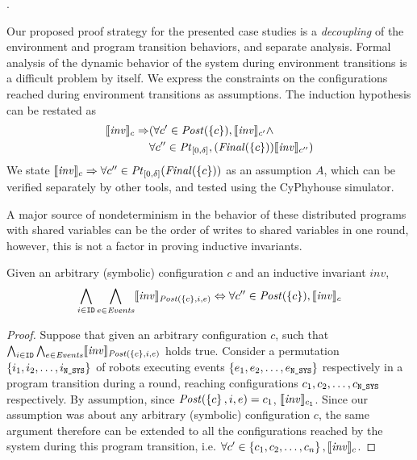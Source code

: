 .

Our proposed proof strategy for the presented case studies is a \emph{decoupling} of the environment and program transition behaviors, and separate analysis. Formal analysis of the dynamic behavior of the system during environment transitions is a difficult problem by itself. We express the constraints on the configurations reached during environment transitions as assumptions. The induction hypothesis can be restated as \begin{align*}\llbracket\mathit{inv}\rrbracket_{c} \Rightarrow &(\forall c' \in \mathit{Post}(\left\{c\right\}), \llbracket\mathit{inv}\rrbracket_{c'} \wedge \\ &\forall c'' \in \mathit{Pt}_{[0,\delta]},(\mathit{Final}(\left\{c\right\})) \llbracket\mathit{inv}\rrbracket_{c''})\end{align*} We state $\llbracket\mathit{inv}\rrbracket_{c} \Rightarrow \forall c'' \in \mathit{Pt}_{[0,\delta]}(\mathit{Final}(\left\{c\right\})) $ as an assumption $A$, which can be verified separately by other tools, and tested using the CyPhyhouse simulator.

 A major source of nondeterminism in the behavior of these distributed programs with shared variables can be the order of writes to shared variables in one round, however, this is not a factor in proving inductive invariants.

\begin{lemma}
   \label{noninter}
Given an arbitrary (symbolic) configuration $c$ and an inductive invariant $\mathit{inv}$,
   {\small
   $$\bigwedge_{i\in \texttt{ID}}\bigwedge_{e \in \mathit{Events}}  \llbracket\mathit{inv}\rrbracket_{\mathit{Post}(\left\{c\right\}, i, e)} \Leftrightarrow \forall c'' \in \mathit{Post}(\left\{c\right\}), \llbracket\mathit{inv}\rrbracket_{c}$$ }
\end{lemma}
\begin{proof}
Suppose that given an arbitrary configuration $c$, such that $\bigwedge_{i\in \texttt{ID}}\bigwedge_{e \in \mathit{Events}} \llbracket\mathit{inv}\rrbracket_{\mathit{Post}(\left\{c\right\}, i, e)}$ holds true. Consider a permutation $\left\{i_1,i_2,\ldots,i_{\texttt{N\_SYS}}\right\}$ of robots executing events $\left\{e_1, e_2, \ldots , e_{\texttt{N\_SYS}}\right\}$ respectively in a program transition during a round, reaching configurations $c_1, c_2, \ldots, c_{\texttt{N\_SYS}}$ respectively. By assumption, since $\mathit{Post}(\left\{c\right\},i,e) = c_1$, $\llbracket\mathit{inv}\rrbracket_{c_1}$. Since our assumption was about any arbitrary (symbolic) configuration $c$, the same argument therefore can be extended to all the configurations reached by the system during this program transition, i.e. $\forall c' \in \left\{c_1, c_2, \ldots, c_n\right\}, \llbracket\mathit{inv}\rrbracket_{c}$.
\end{proof}

